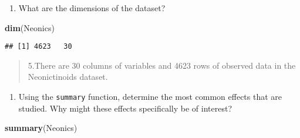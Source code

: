 \documentclass[]{article}
\newenvironment{Shaded}{\begin{snugshade}}{\end{snugshade}}
\newcommand{\KeywordTok}[1]{\textcolor[rgb]{0.13,0.29,0.53}{\textbf{#1}}}
\newcommand{\NormalTok}[1]{#1}
\providecommand{\tightlist}{%
  \setlength{\itemsep}{0pt}\setlength{\parskip}{0pt}}
\begin{document}
\begin{enumerate}
\def\labelenumi{\arabic{enumi}.}
\setcounter{enumi}{4}
\tightlist
\item
  What are the dimensions of the dataset?
\end{enumerate}

\begin{Shaded}
\begin{Highlighting}[]
\KeywordTok{dim}\NormalTok{(Neonics)}
\end{Highlighting}
\end{Shaded}

\begin{verbatim}
## [1] 4623   30
\end{verbatim}

\begin{quote}
5.There are 30 columns of variables and 4623 rows of observed data in
the Neonictinoids dataset.
\end{quote}

\begin{enumerate}
\def\labelenumi{\arabic{enumi}.}
\setcounter{enumi}{5}
\tightlist
\item
  Using the \texttt{summary} function, determine the most common effects
  that are studied. Why might these effects specifically be of interest?
\end{enumerate}

\begin{Shaded}
\begin{Highlighting}[]
\KeywordTok{summary}\NormalTok{(Neonics)}
\end{Highlighting}
\end{Shaded}
\end{document}
